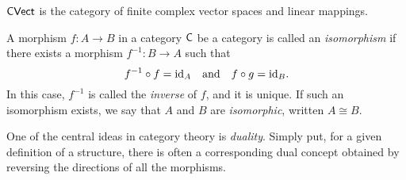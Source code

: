 \begin{example}
 $\mathsf{CVect}$ is the category of finite complex vector spaces and linear mappings.
\end{example}

\begin{comment}
\begin{example}
Given a functional programming language $L$, we can define a category $\catCompFunc$.  In this category, the objects represent the data types of the language \( L \), and the morphisms correspond to computable functions or programs. A function is considered \emph{computable} if a computer program is capable of executing that function.

The composition of morphisms is defined as follows: given two morphisms \( f \colon X \to Y \) and \( g \colon Y \to Z \), the composition \( g \circ f \colon X \to Z \) is defined by applying \( g \) to the output of \( f \). This composition is often written as \( f;g \).

Additionally, the identity morphism \( \id_X \colon X \to X \) represents the ``identity program," which returns its input without making any changes (i.e., it "does nothing").
\end{example}
\end{comment}


\begin{definition} 
 A morphism $f : A \to B$  in a category $\mathsf{C}$ be a category is called an \emph{isomorphism} if there exists a morphism $f^{-1} : B \to A$ such that
\[
f^{-1} \circ f = \mathrm{id}_A \quad \text{and} \quad f \circ g = \mathrm{id}_B.
\]
In this case, $f^{-1}$ is called the \emph{inverse} of $f$, and it is unique. If such an isomorphism exists, we say that $A$ and $B$ are \emph{isomorphic}, written
$A \cong B.$
\end{definition}

One of the central ideas in category theory is \emph{duality}. Simply put, for a given definition of a structure, there is often a corresponding dual concept obtained by reversing the directions of all the morphisms. 


